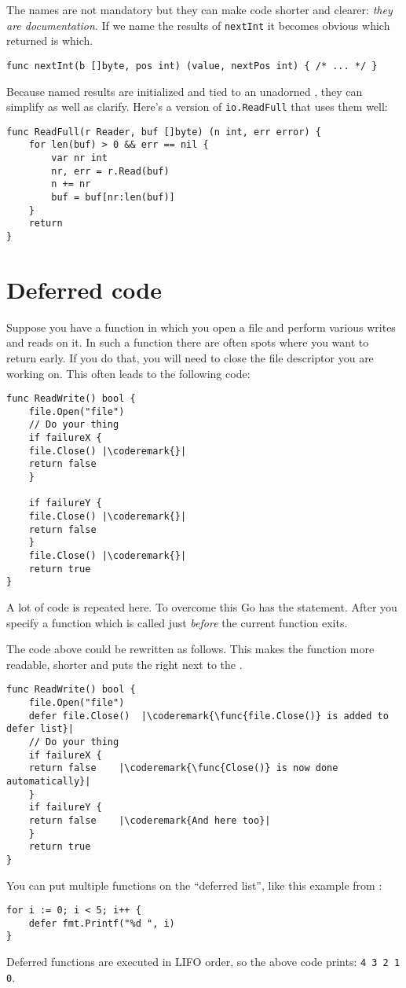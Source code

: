 The names are not mandatory but they can make code shorter and clearer:
\emph{they are documentation}. 
If we name the results of \lstinline{nextInt} it becomes obvious which
returned  is which.

\begin{lstlisting}
func nextInt(b []byte, pos int) (value, nextPos int) { /* ... */ }
\end{lstlisting}
Because named results are initialized and tied to an unadorned
,
they can simplify as well as clarify. Here's a version of
\lstinline{io.ReadFull} that uses them well:

\begin{lstlisting}
func ReadFull(r Reader, buf []byte) (n int, err error) {
    for len(buf) > 0 && err == nil {
        var nr int
        nr, err = r.Read(buf)
        n += nr
        buf = buf[nr:len(buf)]
    }
    return
}
\end{lstlisting}

\section{Deferred code}
\label{sec:deferred code}
Suppose you have a function in which you open a file and perform various
writes and reads on it. In such a function there are often spots where
you want to return early. If you do that, you will need to close the file
descriptor you are working on. This often leads to the following code:
\begin{lstlisting}[caption=Without defer]
func ReadWrite() bool {
    file.Open("file")
    // Do your thing
    if failureX {
	file.Close() |\coderemark{}|
	return false
    }

    if failureY {
	file.Close() |\coderemark{}|
	return false
    }
    file.Close() |\coderemark{}|
    return true
}
\end{lstlisting}
A lot of code is repeated here. To overcome this Go has the
 statement. After
 you specify a function which is called just \emph{before}
the current function exits.

The code above could be rewritten as follows. This makes the 
function more readable, shorter and puts the  right next 
to the .
\begin{lstlisting}[caption=With defer]
func ReadWrite() bool {
    file.Open("file")
    defer file.Close()	|\coderemark{\func{file.Close()} is added to defer list}|
    // Do your thing
    if failureX {
	return false    |\coderemark{\func{Close()} is now done automatically}|
    }
    if failureY {
	return false    |\coderemark{And here too}|
    }
    return true
}
\end{lstlisting}
You can put multiple functions on the ``deferred list'', like this
example from \cite{effective_go}:
\begin{lstlisting}
for i := 0; i < 5; i++ { 
    defer fmt.Printf("%d ", i) 
} 
\end{lstlisting}
Deferred functions are executed in LIFO order, so the above code
prints: \lstinline{4 3 2 1 0}. 

